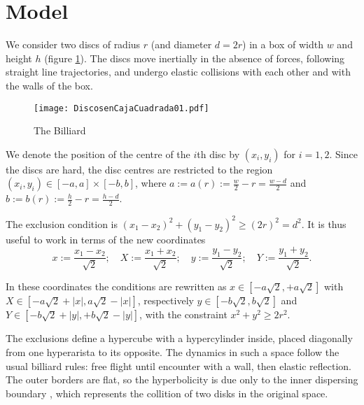 \documentclass[a4paper,10pt, jcp, aps, preprint]{revtex4-1}
\newcommand{\defeq}{:=}
\begin{document}
\section{Model}

We consider two discs of radius $r$ (and diameter $d=2r$) 
in a box of width $w$ and height $h$ (figure
\ref{billar01}). 
The discs move inertially in the absence of forces, 
following straight line trajectories,
and undergo elastic collisions with each 
other and with the walls of the box.

\begin{figure}[h]
  \centering
  \texttt{[image: DiscosenCajaCuadrada01.pdf]}
  \caption{The Billiard}\label{billar01}
\end{figure}


We denote the position of the centre of the $i$th disc by 
$(x_{i}, y_{i})$ for $i=1,2$. Since the discs are hard, 
the disc centres are restricted to the region 
$(x_i, y_i) \in [-a,a] \times [-b, b]$, where 
$a \defeq a(r) \defeq \frac{w}{2} - r = \frac{w-d}{2}$ and
 $b \defeq b(r) \defeq \frac{h}{2} - r = \frac{h-d}{2}$.


The exclusion condition is $(x_1-x_2)^2 + (y_1-y_2)^2 \ge (2r)^2 = d^2$.
It is thus useful to work in terms of the new coordinates
\begin{equation}\label{cambiocoor01}
 x \defeq \frac{x_1 - x_2}{\sqrt{2}}; 
\quad X \defeq \frac{x_1 + x_2}{\sqrt{2}}; 
\quad y \defeq \frac{y_1 - y_2}{\sqrt{2}}; 
\quad Y \defeq \frac{y_1 + y_2}{\sqrt{2}}.
\end{equation}


In these coordinates the conditions are rewritten as
$x \in [-a \sqrt{2}, +a \sqrt{2}]$ with 
$X \in [-a \sqrt{2} + |x|, a \sqrt{2} - |x|]$, respectively 
 $y \in [-b \sqrt{2}, b \sqrt{2}]$ and $Y \in [-b \sqrt{2} + |y|, +b \sqrt{2} - |y|]$,  
with the constraint $x^2 + y^2 \ge 2 r^2$.

The exclusions define a hypercube with a hypercylinder inside, placed diagonally 
from one hyperarista to its opposite. 
The dynamics in such a space follow
the usual billiard rules: free flight until
encounter with a wall, then elastic reflection.
The outer borders are flat, so the
hyperbolicity is due only to the inner dispersing
boundary \cite{Sim99}, which represents the collition of
two disks in the original space.


\end{document}
